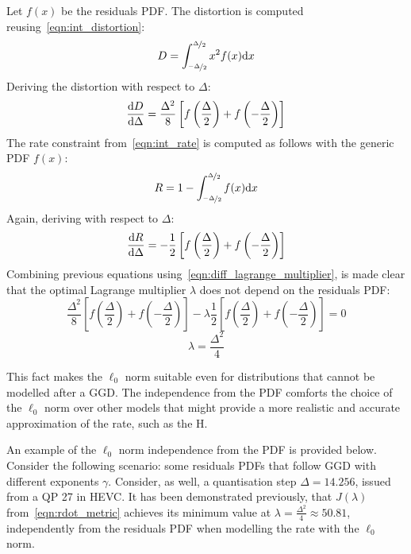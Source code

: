 \documentclass[11pt,a4paper,openright,twoside]{book}
\numberwithin{equation}{section} %
\numberwithin{figure}{section} %
\numberwithin{table}{section} %
\begin{document}
Let $f(x)$ be the residuals \ac{PDF}.
The distortion is computed reusing~\eqref{eqn:int_distortion}:
\begin{equation}
	D = \int_{\nicefrac{-\Delta}{2}}^{\nicefrac{\Delta}{2}} x^2 f(x) \text{d} x
\end{equation}
Deriving the distortion with respect to $\Delta$:
\begin{equation}
	\frac{\text{d} D}{\text{d} \Delta} =
	\frac{\Delta^2}{8}\left[
	f\left(\frac{\Delta}{2}\right)+f\left(-\frac{\Delta}{2}\right)\right]
\end{equation}
The rate constraint from~\eqref{eqn:int_rate} is computed as
follows with the generic \ac{PDF}
$f(x)$:
\begin{equation}
	R = 1 - \int_{\nicefrac{-\Delta}{2}}^{\nicefrac{\Delta}{2}} f(x) \text{d} x\\
\end{equation}
Again, deriving with respect to $\Delta$:
\begin{equation}
	\frac{\text{d} R}{\text{d} \Delta} =
	-\frac{1}{2}\left[
	f\left(\frac{\Delta}{2}\right)+
	f\left(-\frac{\Delta}{2}\right)\right]
\end{equation}
Combining previous equations using~\eqref{eqn:diff_lagrange_multiplier},
is made clear that the optimal Lagrange multiplier $\lambda$ does not
depend on the residuals \ac{PDF}:
\begin{equation}
	\frac{\Delta^2}{8}\left[
	f\left(\frac{\Delta}{2}\right)+f\left(-\frac{\Delta}{2}\right)\right]
	- \lambda
	\frac{1}{2}\left[
	f\left(\frac{\Delta}{2}\right)+
	f\left(-\frac{\Delta}{2}\right)\right] = 0
\end{equation}
\begin{equation}
	\boxed{\lambda = \frac{\Delta^2}{4}}
\end{equation}

This fact makes the $\ell_0$ norm suitable even for distributions
that cannot be modelled after a \ac{GGD}.
The independence from the \ac{PDF} comforts the choice of the $\ell_0$
norm over other models that might provide a more realistic and accurate
approximation of the rate, such as the H.

An example of the $\ell_0$ norm independence from the \ac{PDF} is provided
below.
Consider the following scenario: some residuals \acp{PDF} that follow
\ac{GGD} with different exponents $\gamma$.
Consider, as well, a quantisation step $\Delta=14.256$, issued from a
\ac{QP} 27 in \ac{HEVC}.
It has been demonstrated previously, that $J(\lambda)$
from~\eqref{eqn:rdot_metric} achieves its minimum value at
$\lambda=\frac{\Delta^2}{4}\approx50.81$, independently from the
residuals \ac{PDF} when modelling the rate with the $\ell_0$ norm.
\end{document}
